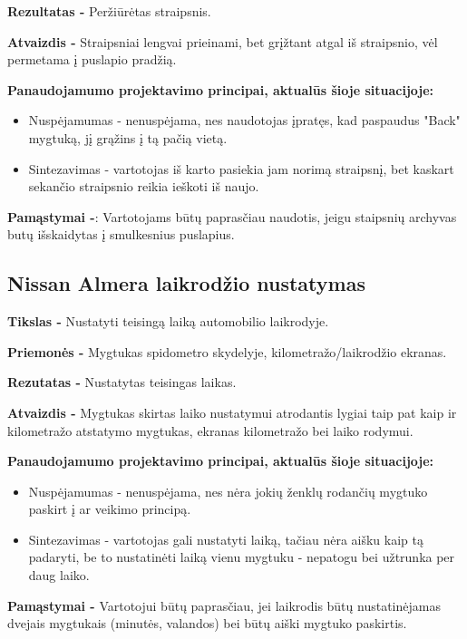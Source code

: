 ﻿\documentclass[a4paper, 12pt]{article}
\begin{document}
		\textbf{Rezultatas -}
		Peržiūrėtas straipsnis.

		\textbf{Atvaizdis -}
		Straipsniai lengvai prieinami, bet grįžtant atgal iš straipsnio, vėl permetama į puslapio pradžią.
		
		\textbf{Panaudojamumo projektavimo principai, aktualūs šioje situacijoje:}
		\begin{itemize}
		\item Nuspėjamumas - nenuspėjama, nes naudotojas įpratęs, kad paspaudus "Back" mygtuką, jį grąžins į tą pačią vietą.
		\item Sintezavimas - vartotojas iš karto pasiekia jam norimą straipsnį, bet kaskart sekančio straipsnio reikia ieškoti iš naujo.	
		\end{itemize}

		\textbf{Pamąstymai -}:
		Vartotojams būtų paprasčiau naudotis, jeigu staipsnių archyvas butų išskaidytas į smulkesnius puslapius.

	\subsection{Nissan Almera laikrodžio nustatymas}
		\textbf{Tikslas -}
		Nustatyti teisingą laiką automobilio laikrodyje.

		\textbf{Priemonės -}
		Mygtukas spidometro skydelyje, kilometražo/laikrodžio ekranas.

		\textbf{Rezutatas -}
		Nustatytas teisingas laikas.

		\textbf{Atvaizdis -}
		Mygtukas skirtas laiko nustatymui atrodantis lygiai taip pat kaip ir kilometražo atstatymo mygtukas,
		ekranas kilometražo bei laiko rodymui.
		
		\textbf{Panaudojamumo projektavimo principai, aktualūs šioje situacijoje:}
		\begin{itemize}
		\item Nuspėjamumas - nenuspėjama, nes nėra jokių ženklų rodančių mygtuko paskirt į ar veikimo principą.
		\item Sintezavimas - vartotojas gali nustatyti laiką, tačiau nėra aišku kaip tą padaryti, be
		to nustatinėti laiką vienu mygtuku - nepatogu bei užtrunka per daug laiko.
		\end{itemize}

		\textbf{Pamąstymai -}
		Vartotojui būtų paprasčiau, jei laikrodis būtų nustatinėjamas dvejais mygtukais (minutės, valandos)
		bei būtų aiški mygtuko paskirtis.
\end{document}
